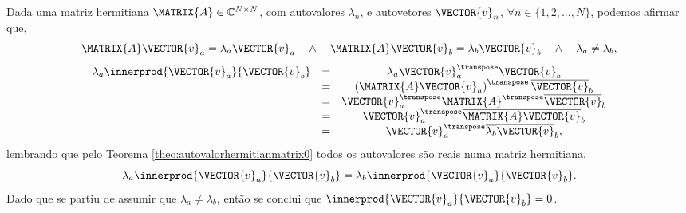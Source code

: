 \begin{myproofT}\label{proof:theo:autovetorortogonalhermitian0}
Dada uma matriz hermitiana $\MATRIX{A} \in \mathbb{C}^{N \times N}$, com  autovalores $\lambda_n$,
e autovetores $\VECTOR{v}_n$, $\forall n \in \{1, 2, ..., N\}$, podemos afirmar que,
\begin{equation}
\MATRIX{A} \VECTOR{v}_a= \lambda_a \VECTOR{v}_a 
\quad \wedge \quad 
\MATRIX{A} \VECTOR{v}_b= \lambda_b \VECTOR{v}_b
\quad \wedge \quad 
\lambda_a \neq \lambda_b, 
\end{equation}
\begin{equation}
\begin{matrix}
\lambda_a \innerprod{\VECTOR{v}_a}{\VECTOR{v}_b} & = & \lambda_a \VECTOR{v}_a^{\transpose} \overline{\VECTOR{v}}_b\\
~ & = & \left( \MATRIX{A}\VECTOR{v}_a\right)^{\transpose} \overline{\VECTOR{v}}_b \\
~ & = & \VECTOR{v}_a^{\transpose} \MATRIX{A}^{\transpose} \overline{\VECTOR{v}}_b \\
~ & = & \VECTOR{v}_a^{\transpose} \overline{\MATRIX{A}} \overline{\VECTOR{v}}_b \\
~ & = & \VECTOR{v}_a^{\transpose} \overline{\lambda_b} \overline{\VECTOR{v}}_b,
\end{matrix}
\end{equation}
lembrando que pelo Teorema \ref{theo:autovalorhermitianmatrix0} todos os autovalores são reais 
numa matriz hermitiana,
\begin{equation}
\lambda_a \innerprod{\VECTOR{v}_a}{\VECTOR{v}_b} = \lambda_b \innerprod{\VECTOR{v}_a}{\VECTOR{v}_b}.
\end{equation}
Dado que se partiu de assumir que $\lambda_a \neq \lambda_b$, 
então se conclui que $\innerprod{\VECTOR{v}_a}{\VECTOR{v}_b}=0$.
\end{myproofT}

